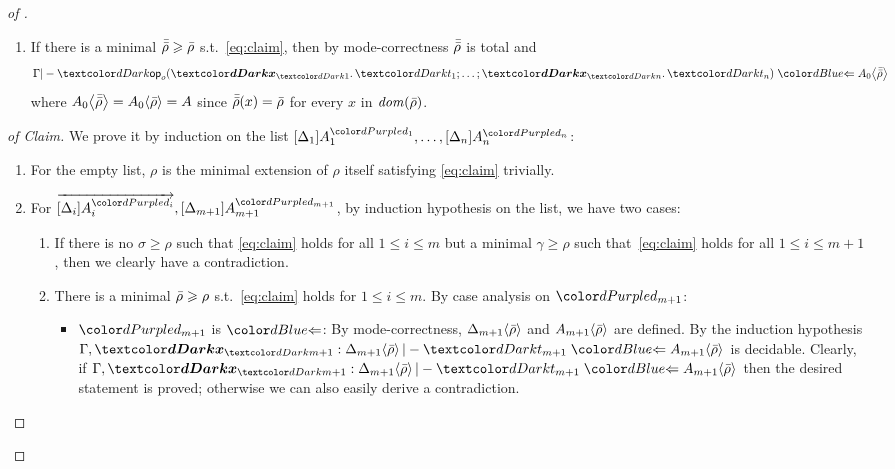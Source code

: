 \begin{proof}[of {}]
\begin{itemize}
\begin{enumerate}
\begin{enumerate}
                \item If there is a minimal $\bar{\bar{\rho}} \geqslant \bar{\rho}$ s.t.\ \eqref{eq:claim}, then by mode-correctness $\bar{\bar{\rho}}$ is total and
                  \[
                    \Gamma |- \tmOpts \chk \simsub{A_0}{\ext{\ext{\rho}}}
                  \]
                  where ${A_0}\!\left<{\bar{\bar{\rho}}}\right> = {A_0}\!\left<{\bar{\rho}}\right> = A$ since $\bar{\bar{\rho}}(x) = \bar{\rho}$ for every $x$ in $\mathit{dom}(\bar{\rho})$.
              \end{enumerate}
          \end{enumerate}
      \end{itemize}
      \begin{proof}[of Claim]
        We prove it by induction on the list $\biargs$:
        \begin{enumerate}
          \item For the empty list, $\rho$ is the minimal extension of $\rho$ itself satisfying \eqref{eq:claim} trivially. 
          \item For $\biargvec, \biarg[m+1]$, by induction hypothesis on the list, we have two cases:
            \begin{enumerate}
              \item If there is no $\sigma \geq \rho$ such that \eqref{eq:claim} holds for all $1 \leq i \leq m$ but a minimal $\gamma \geq \rho$ such that~\eqref{eq:claim} holds for all $1 \leq i \leq m + 1$, then we clearly have a contradiction.
              \item There is a minimal $\bar{\rho} \geqslant \rho$ s.t.\ \eqref{eq:claim} holds for $1 \leq i \leq m$.
                By case analysis on $\dir{d_{m+1}}$:
                \begin{itemize}
                  \item $\dir{d_{m+1}}$ is $\chk$: By mode-correctness, ${\Delta_{m+1}}\!\left<{\bar{\rho}}\right>$ and ${A_{m+1}}\!\left<{\bar{\rho}}\right>$ are defined.
                    By the induction hypothesis $ \Gamma, \vars{x}_\isTerm{m+1} : \simsub{\Delta_{m+1}}{\ext{\rho}} |- \isTerm{t_{m+1}} \chk \simsub{A_{m+1}}{\ext{\rho}}$ is decidable.
                    Clearly, if $\Gamma, \vars{x}_\isTerm{m+1} : \simsub{\Delta_{m+1}}{\ext{\rho}} |- \isTerm{t_{m+1}} \chk \simsub{A_{m+1}}{\ext{\rho}}$ then the desired statement is proved; otherwise we can also easily derive a contradiction.


\end{itemize}
\end{enumerate}
\end{enumerate}
\end{proof}
\end{proof}
